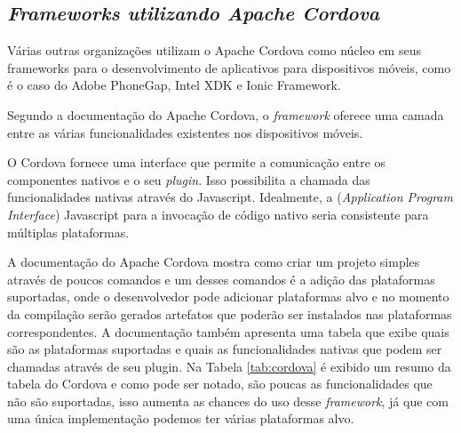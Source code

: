 \subsection{\normalfont\itshape Frameworks utilizando Apache Cordova}
Várias outras organizações utilizam o Apache Cordova como núcleo em seus frameworks para o desenvolvimento de aplicativos para dispositivos móveis, como é o caso do Adobe PhoneGap, Intel XDK e Ionic Framework.

Segundo a documentação do Apache Cordova, o \textit{framework} oferece uma camada entre as várias funcionalidades existentes nos dispositivos móveis.
\begin{citacao}
O Cordova fornece uma interface que permite a comunicação entre os componentes nativos e o seu \textit{plugin}. Isso possibilita a chamada das funcionalidades nativas através do Javascript. Idealmente, a  (\textit{Application Program Interface}) Javascript para a invocação de código nativo seria consistente para múltiplas plataformas. \cite{cordova}
\end{citacao}

A documentação do Apache Cordova mostra como criar um projeto simples através de poucos comandos e um desses comandos é a adição das plataformas suportadas, onde o desenvolvedor pode adicionar plataformas alvo e no momento da compilação serão gerados artefatos que poderão ser instalados nas plataformas correspondentes.
A documentação também apresenta uma tabela que exibe quais são as plataformas suportadas e quais as funcionalidades nativas que podem ser chamadas através de seu plugin.
Na Tabela \ref{tab:cordova} é exibido um resumo da tabela do Cordova e como pode ser notado, são poucas as funcionalidades que não são suportadas, isso aumenta as chances do uso desse \textit{framework}, já que com uma única implementação podemos ter várias plataformas alvo.


